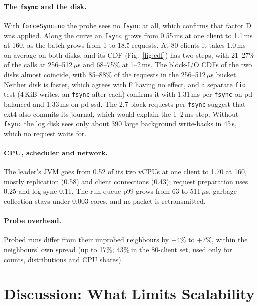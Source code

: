 \documentclass{llncs}
\begin{document}
\paragraph{The \texttt{fsync} and the disk.} With \texttt{forceSync=no} the probe sees no \texttt{fsync} at all, which confirms that factor D was applied. Along the curve an \texttt{fsync} grows from 0.55\,ms at one client to 1.1\,ms at 160, as the batch grows from 1 to 18.5 requests. At 80 clients it takes 1.0\,ms on average on both disks, and its CDF (Fig.~\ref{fig:cdf}) has two steps, with 21--27\% of the calls at 256--512\,$\mu$s and 68--75\% at 1--2\,ms. The block-I/O CDFs of the two disks almost coincide, with 85--88\% of the requests in the 256--512\,$\mu$s bucket. Neither disk is faster, which agrees with F having no effect, and a separate \texttt{fio} test (4\,KiB writes, an \texttt{fsync} after each) confirms it with 1.31\,ms per \texttt{fsync} on pd-balanced and 1.33\,ms on pd-ssd. The 2.7 block requests per \texttt{fsync} suggest that ext4 also commits its journal, which would explain the 1--2\,ms step. Without \texttt{fsync} the log disk sees only about 390 large background write-backs in 45\,s, which no request waits for.

\paragraph{CPU, scheduler and network.} The leader's JVM goes from 0.52 of its two vCPUs at one client to 1.70 at 160, mostly replication (0.58) and client connections (0.43); request preparation uses 0.25 and log sync 0.11. The run-queue p99 grows from 63 to 511\,$\mu$s, garbage collection stays under 0.003 cores, and no packet is retransmitted.

\paragraph{Probe overhead.} Probed runs differ from their unprobed neighbours by $-4\%$ to $+7\%$, within the neighbours' own spread (up to 17\%; 43\% in the 80-client set, used only for counts, distributions and CPU shares).

\section{Discussion: What Limits Scalability}
\label{sec:discussion}
\end{document}
